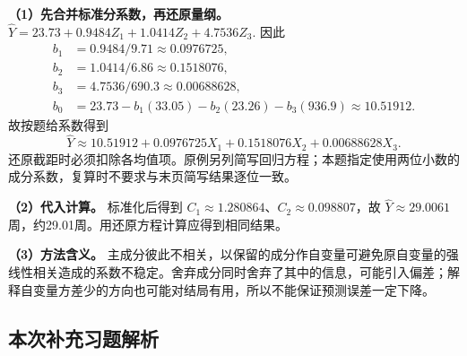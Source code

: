\textbf{（1）先合并标准分系数，再还原量纲。} \(\widehat Y=23.73+0.9484Z_1+1.0414Z_2+4.7536Z_3.\) 因此 \[\begin{aligned}
b_1&=0.9484/9.71\approx0.0976725,\\
b_2&=1.0414/6.86\approx0.1518076,\\
b_3&=4.7536/690.3\approx0.00688628,\\
b_0&=23.73-b_1(33.05)-b_2(23.26)-b_3(936.9)\approx10.51912.
\end{aligned}\] 故按题给系数得到 \[\boxed{\widehat Y\approx10.51912+0.0976725X_1+0.1518076X_2+0.00688628X_3.}\] 还原截距时必须扣除各均值项。原例另列简写回归方程；本题指定使用两位小数的成分系数，复算时不要求与末页简写结果逐位一致。

\textbf{（2）代入计算。} 标准化后得到 \(C_1\approx1.280864\)、\(C_2\approx0.098807\)，故 \(\widehat Y\approx29.0061\)周，约29.01周。用还原方程计算应得到相同结果。

\textbf{（3）方法含义。} 主成分彼此不相关，以保留的成分作自变量可避免原自变量的强线性相关造成的系数不稳定。舍弃成分同时舍弃了其中的信息，可能引入偏差；解释自变量方差少的方向也可能对结局有用，所以不能保证预测误差一定下降。
\subsection*{本次补充习题解析}

\EndExercises
